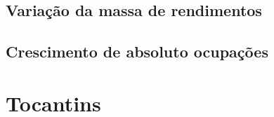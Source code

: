 \documentclass[8pt]{beamer}
\begin{document}
\subsection{Variação da massa de rendimentos}

\begin{frame}
\textit{\hyperlink{indice_principal_amz_rr}{}}

\end{frame}

\begin{frame}
\textit{\hyperlink{indice_principal_amz_rr}{}}

\end{frame}

\subsection{Crescimento de absoluto ocupações}

\begin{frame}
\textit{\hyperlink{indice_principal_amz_rr}{}}

\end{frame}

\begin{frame}
\textit{\hyperlink{indice_principal_amz_rr}{}}

\end{frame}

\section{Tocantins}
\end{document}
